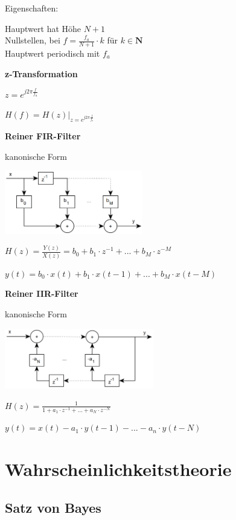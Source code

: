 Eigenschaften:

Hauptwert hat Höhe $N+1$\\
Nullstellen, bei $\displaystyle{
    f = \frac{f_a}{N+1} \cdot k
}$ für
$\displaystyle{
    k \in \mathbf{N}
}$\\
Hauptwert periodisch mit $f_a$

\textbf{z-Transformation}

$\displaystyle{
    z = e^{j2\pi \frac{f}{f_a}}
}$

$\displaystyle{
    H(f) = H(z) \bigg \vert _{z=e^{j2\pi \frac{f}{f_a}}}
}$

\textbf{Reiner FIR-Filter}

kanonische Form

\includegraphics[width=6cm]{img/fir.png}

$\displaystyle{
    H(z) = \frac{Y(z)}{X(z)} = b_0 + b_1 \cdot z^{-1} + ... + b_M \cdot z^{-M}
}$

$\displaystyle{
    y(t) = b_0 \cdot x(t) + b_1 \cdot x(t-1) + ... + b_M \cdot x(t-M)
}$

\textbf{Reiner IIR-Filter}

kanonische Form

\includegraphics[width=6.5cm]{img/iir.png}

$\displaystyle{
    H(z) = \frac{1}{1 + a_1 \cdot z^{-1} + ... + a_N \cdot z^{-N}}
}$

$\displaystyle{
    y(t) = x(t) - a_1 \cdot y(t-1) - ... - a_n \cdot y(t-N)
}$

\section{Wahrscheinlichkeitstheorie}

\subsection{Satz von Bayes}

